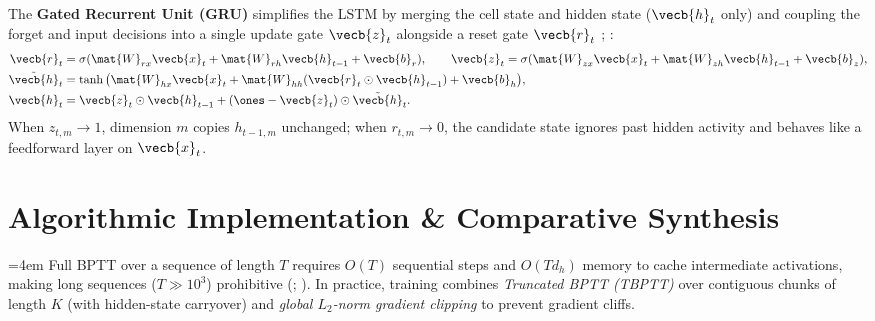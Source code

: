 \documentclass[../../../../master.tex]{subfiles}
\begin{document}
The \textbf{Gated Recurrent Unit (GRU)} simplifies the LSTM by merging the cell state and hidden state ($\vecb{h}_t$ only) and coupling the forget and input decisions into a single update gate $\vecb{z}_t$ alongside a reset gate $\vecb{r}_t$ ; :
\begin{align}
  \vecb{r}_t &= \sigma(\mat{W}_{rx}\vecb{x}_t + \mat{W}_{rh}\vecb{h}_{t-1} + \vecb{b}_r), \qquad
  \vecb{z}_t = \sigma(\mat{W}_{zx}\vecb{x}_t + \mat{W}_{zh}\vecb{h}_{t-1} + \vecb{b}_z), \label{eq:rnn:gru_gates} \\
  \tilde{\vecb{h}}_t &= \tanh\big(\mat{W}_{hx}\vecb{x}_t + \mat{W}_{hh}(\vecb{r}_t \odot \vecb{h}_{t-1}) + \vecb{b}_h\big), \label{eq:rnn:gru_cand} \\
  \vecb{h}_t &= \vecb{z}_t \odot \vecb{h}_{t-1} + (\ones - \vecb{z}_t) \odot \tilde{\vecb{h}}_t. \label{eq:rnn:gru_state}
\end{align}
When $z_{t,m} \to 1$, dimension $m$ copies $h_{t-1,m}$ unchanged; when $r_{t,m} \to 0$, the candidate state ignores past hidden activity and behaves like a feedforward layer on $\vecb{x}_t$.

\section{Algorithmic Implementation \& Comparative Synthesis}
\label{sec:rnn:algorithms}

{\sloppy\emergencystretch=4em
Full BPTT over a sequence of length $T$ requires $O(T)$ sequential steps and $O(T d_h)$ memory to cache intermediate activations, making long sequences ($T \gg 10^3$) prohibitive (; ). In practice, training combines \emph{Truncated BPTT (TBPTT)} over contiguous chunks of length $K$ (with hidden-state carryover) and \emph{global $L_2$-norm gradient clipping}  to prevent gradient cliffs.\par}
\end{document}
